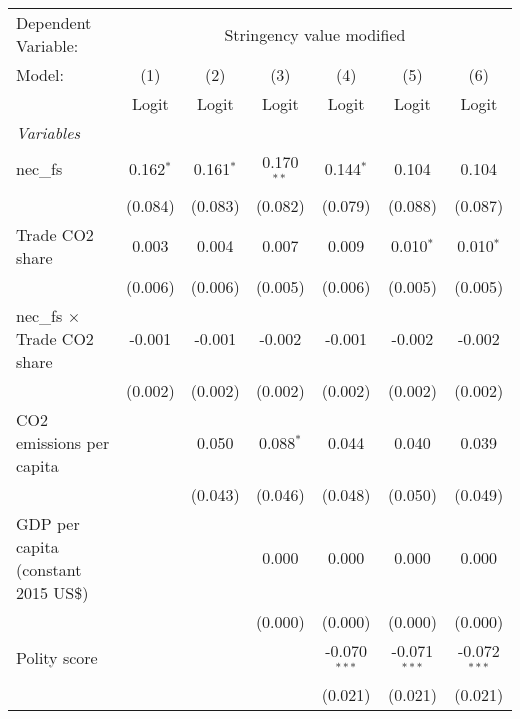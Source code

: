 
\begingroup
\centering
\begin{tabular}{lcccccc}
   \toprule
   Dependent Variable: & \multicolumn{6}{c}{Stringency value modified}\\
   Model:                               & (1)         & (2)         & (3)          & (4)            & (5)            & (6)\\  
                                        &  Logit      & Logit       & Logit        & Logit          & Logit          & Logit\\  
   \midrule
   \emph{Variables}\\
   nec\_fs                              & 0.162$^{*}$ & 0.161$^{*}$ & 0.170$^{**}$ & 0.144$^{*}$    & 0.104          & 0.104\\   
                                        & (0.084)     & (0.083)     & (0.082)      & (0.079)        & (0.088)        & (0.087)\\   
   Trade CO2 share                      & 0.003       & 0.004       & 0.007        & 0.009          & 0.010$^{*}$    & 0.010$^{*}$\\   
                                        & (0.006)     & (0.006)     & (0.005)      & (0.006)        & (0.005)        & (0.005)\\   
   nec\_fs $\times$ Trade CO2 share     & -0.001      & -0.001      & -0.002       & -0.001         & -0.002         & -0.002\\   
                                        & (0.002)     & (0.002)     & (0.002)      & (0.002)        & (0.002)        & (0.002)\\   
   CO2 emissions per capita             &             & 0.050       & 0.088$^{*}$  & 0.044          & 0.040          & 0.039\\   
                                        &             & (0.043)     & (0.046)      & (0.048)        & (0.050)        & (0.049)\\   
   GDP per capita (constant 2015 US\$)  &             &             & 0.000        & 0.000          & 0.000          & 0.000\\   
                                        &             &             & (0.000)      & (0.000)        & (0.000)        & (0.000)\\   
   Polity score                         &             &             &              & -0.070$^{***}$ & -0.071$^{***}$ & -0.072$^{***}$\\   
                                        &             &             &              & (0.021)        & (0.021)        & (0.021)\\   

\end{tabular}
